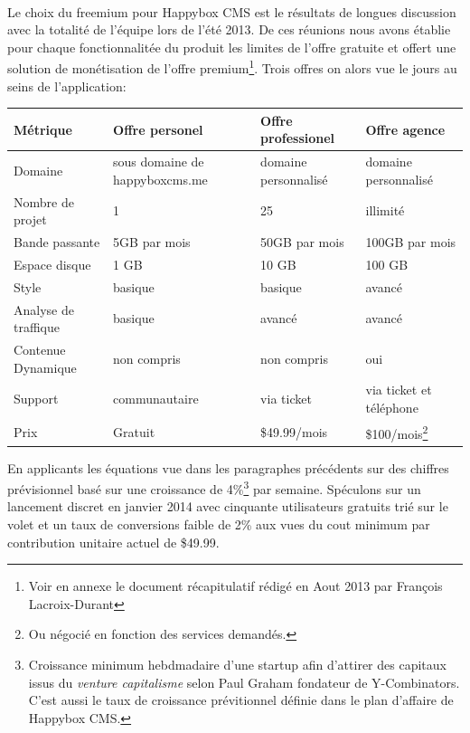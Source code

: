 \documentclass[11pt, a4paper ]{article}
\begin{document}
\paragraph{} %
Le choix du freemium pour Happybox CMS est le résultats de longues discussion avec la totalité de l'équipe lors de l'été 2013. De ces réunions nous avons établie pour chaque fonctionnalitée du produit les limites de l'offre gratuite et offert une solution de monétisation de l'offre premium\footnote{Voir en annexe le document récapitulatif rédigé en Aout 2013 par François Lacroix-Durant}.
Trois offres on alors vue le jours au seins de l'application:

\begin{center}
	\begin{tabular}[width=\textwidth]{| l | l | l | l |}
		Métrique & Offre personel & Offre professionel & Offre agence \\
		\hline
		Domaine & sous domaine de happyboxcms.me & domaine personnalisé & domaine personnalisé \\
		Nombre de projet & 1 & 25 & illimité \\
		Bande passante & 5GB par mois & 50GB par mois & 100GB par mois \\
		Espace disque & 1 GB & 10 GB & 100 GB \\
		Style & basique & basique & avancé \\
		Analyse de traffique & basique & avancé & avancé \\
		Contenue Dynamique & non compris & non compris & oui \\
		Support & communautaire & via ticket & via ticket et téléphone  \\
		Prix & Gratuit & \$49.99/mois & \$100/mois\footnote{Ou négocié en fonction des services demandés.} \\

	\end{tabular}
\end{center}

En applicants les équations vue dans les paragraphes précédents sur des chiffres prévisionnel basé sur une croissance de 4\%\footnote{Croissance minimum hebdmadaire d'une startup afin d'attirer des capitaux issus du \emph{venture capitalisme} selon Paul Graham fondateur de Y-Combinators. C'est aussi le taux de croissance prévitionnel définie dans le plan d'affaire de Happybox CMS.} par semaine.
Spéculons sur un lancement discret en janvier 2014 avec cinquante utilisateurs gratuits trié sur le volet et un taux de conversions faible de 2\% aux vues du cout minimum par contribution unitaire actuel de \$49.99.
\end{document}
